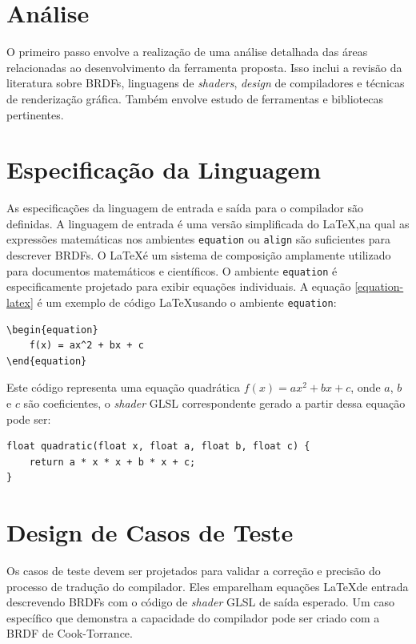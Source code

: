 \documentclass[english, 
               brazil, 
               bsc] %
               {dcomp-abntex2}
\begin{document}
\section{Análise } \label{analise}

O primeiro passo envolve a realização de uma análise detalhada das áreas relacionadas ao desenvolvimento da ferramenta proposta. Isso inclui a revisão da literatura sobre BRDFs, linguagens de \textit{shaders}, \textit{design} de compiladores e técnicas de renderização gráfica. Também envolve estudo de ferramentas e bibliotecas pertinentes.


\section{Especificação da Linguagem}

As especificações da linguagem de entrada e saída para o compilador são definidas. A linguagem de entrada é uma versão simplificada do \LaTeX ,na qual as expressões matemáticas nos ambientes \texttt{equation} ou \texttt{align} são suficientes para descrever BRDFs. O \LaTeX  é um sistema de composição amplamente utilizado para documentos matemáticos e científicos. O ambiente \texttt{equation} é especificamente projetado para exibir equações individuais. A equação \ref{equation-latex} é um exemplo de código \LaTeX  usando o ambiente \texttt{equation}:


\label{equation-latex}
\begin{verbatim}
\begin{equation}
    f(x) = ax^2 + bx + c
\end{equation}
\end{verbatim}


Este código representa uma equação quadrática \( f(x) = ax^2 + bx + c \), onde \( a \), \( b \) e \( c \) são coeficientes, o \textit{shader} GLSL correspondente gerado a partir dessa equação pode ser:  
\begin{verbatim}
float quadratic(float x, float a, float b, float c) {
    return a * x * x + b * x + c;
}
\end{verbatim}

\section{Design de Casos de Teste} \label{testes}



Os casos de teste devem ser projetados para validar a correção e precisão do processo de tradução do compilador. Eles emparelham equações \LaTeX  de entrada descrevendo BRDFs com o código de \textit{shader} GLSL de saída esperado. Um caso específico que demonstra a capacidade do compilador pode ser criado com a BRDF de Cook-Torrance.
\end{document}
